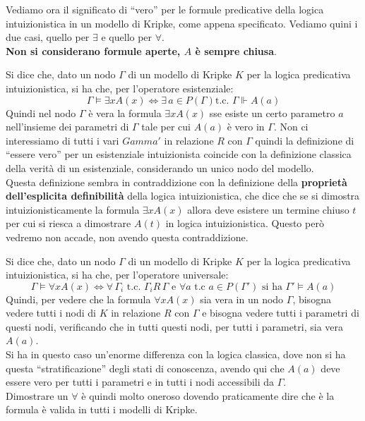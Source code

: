 \documentclass[a4paper,12pt, oneside]{book}
\begin{document}
Vediamo ora il significato di ``vero'' per le formule predicative della logica
intuizionistica in un modello di Kripke, come appena specificato. Vediamo quini
i due casi, quello per $\exists$ e quello per $\forall$. \\
\textbf{Non si considerano formule aperte, $A$ è sempre chiusa}.
\begin{definizione}
  Si dice che, dato un nodo $\Gamma$ di un modello di Kripke $K$ per la logica
  predicativa intuizionistica, si ha che, per l'operatore esistenziale:
  \[\Gamma\vDash \exists xA(x)\iff \exists\, a\in P(\Gamma)\mbox{
      t.c. }\Gamma\Vdash A(a)\]
  Quindi nel nodo $\Gamma$ è vera la formula $\exists xA(x)$ sse esiste un certo
  parametro $a$ nell'insieme dei parametri di $\Gamma$ tale per cui $A(a)$ è
  vero in $\Gamma$. Non ci interessiamo di tutti i vari $Gamma'$ in relazione
  $R$ con $\Gamma$ quindi la definizione di ``essere vero'' per un esistenziale
  intuizionista coincide con la definizione classica della verità di un
  esistenziale, considerando un unico nodo del modello.\\
  Questa definizione sembra in contraddizione con la definizione della
  \textbf{proprietà dell'esplicita definibilità} della 
  logica intuizionistica, che dice che se si dimostra intuizionisticamente la
  formula $\exists x A(x)$ allora deve esistere un termine chiuso $t$ per cui si
  riesca a dimostrare $A(t)$ in logica intuizionistica. Questo però vedremo non
  accade, non avendo questa contraddizione.
\end{definizione}
\begin{definizione}
  Si dice che, dato un nodo $\Gamma$ di un modello di Kripke $K$ per la logica
  predicativa intuizionistica, si ha che, per l'operatore universale:
  \[\Gamma\vDash \forall xA(x)\iff \forall \,\Gamma_i \mbox{ t.c. }\Gamma_i
    R\,\Gamma \mbox{ e } \forall a \mbox{ t.c }a\in P(\Gamma')\mbox{ si ha }
    \Gamma'\vDash A(a)\]
  Quindi, per vedere che la formula $\forall xA(x)$ sia vera in un nodo
  $\Gamma$, bisogna vedere tutti i nodi di $K$ in relazione $R$ con $\Gamma$ e
  bisogna vedere tutti i parametri di questi nodi, verificando che in tutti
  questi nodi, per tutti i parametri, sia vera $A(a)$.\\
  Si ha in questo caso un'enorme differenza con la logica classica, dove non si
  ha questa ``stratificazione'' degli stati di conoscenza, avendo qui che
  $A(a)$ deve essere vero per tutti i parametri e in tutti i nodi accessibili
  da $\Gamma$.\\
  Dimostrare un $\forall$ è quindi molto oneroso dovendo praticamente dire che è
  la formula è valida in tutti i modelli di Kripke.
\end{definizione}
\end{document}
